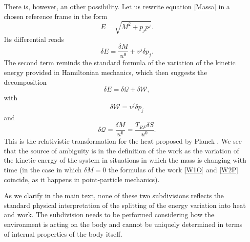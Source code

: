 \documentclass[twocolumn,usenatbib]{mnras2}
\begin{document}
There is, however, an other possibility. Let us rewrite equation \eqref{Massa} in a chosen reference frame in the form
\begin{equation}
E = \sqrt{M^2 + p_j p^j}.
\end{equation}
Its differential reads
\begin{equation}
\delta E = \dfrac{\delta M}{u^0} + v^j \delta p_j.
\end{equation}
The second term reminds the standard formula of the variation of the kinetic energy provided in Hamiltonian mechanics, which then suggests the decomposition
\begin{equation}
\delta E = \delta \mathcal{Q} +\delta \mathcal{W},
\end{equation}
with
\begin{equation}\label{W2P}
\delta \mathcal{W} = v^j \delta p_j
\end{equation}
and
\begin{equation}
\delta \mathcal{Q} = \dfrac{\delta M}{u^0} = \dfrac{T_{RF} \delta S}{u^0}.
\end{equation}
This is the relativistic transformation for the heat proposed by Planck \citep{Pinto2017}. We see that the source of ambiguity is in the definition of the work as the variation of the kinetic energy of the system in situations in which the mass is changing with time (in the case in which $\delta M =0$ the formulas of the work \eqref{W1O} and \eqref{W2P} coincide, as it happens in point-particle mechanics). 

As we clarify in the main text, none of these two subdivisions reflects the standard physical interpretation of the splitting of the energy variation into heat and work. The subdivision needs to be performed considering how the environment is acting on the body and cannot be uniquely determined in terms of internal properties of the body itself.






\end{document}
